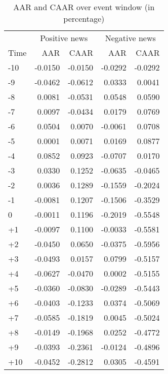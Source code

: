 \begin{table}[ht]
\centering
\begin{tabular}{lrrrr}
  \hline
   & \multicolumn{2}{c}{Positive news} & \multicolumn{2}{c}{Negative news}  \\
  Time & AAR & CAAR & AAR & CAAR \\
 \hline
-10 & -0.0150 & -0.0150 & -0.0292 & -0.0292 \\ 
  -9 & -0.0462 & -0.0612 & 0.0333 & 0.0041 \\ 
  -8 & 0.0081 & -0.0531 & 0.0548 & 0.0590 \\ 
  -7 & 0.0097 & -0.0434 & 0.0179 & 0.0769 \\ 
  -6 & 0.0504 & 0.0070 & -0.0061 & 0.0708 \\ 
  -5 & 0.0001 & 0.0071 & 0.0169 & 0.0877 \\ 
  -4 & 0.0852 & 0.0923 & -0.0707 & 0.0170 \\ 
  -3 & 0.0330 & 0.1252 & -0.0635 & -0.0465 \\ 
  -2 & 0.0036 & 0.1289 & -0.1559 & -0.2024 \\ 
  -1 & -0.0081 & 0.1207 & -0.1506 & -0.3529 \\ 
  0 & -0.0011 & 0.1196 & -0.2019 & -0.5548 \\ 
  +1 & -0.0097 & 0.1100 & -0.0033 & -0.5581 \\ 
  +2 & -0.0450 & 0.0650 & -0.0375 & -0.5956 \\ 
  +3 & -0.0493 & 0.0157 & 0.0799 & -0.5157 \\ 
  +4 & -0.0627 & -0.0470 & 0.0002 & -0.5155 \\ 
  +5 & -0.0360 & -0.0830 & -0.0289 & -0.5443 \\ 
  +6 & -0.0403 & -0.1233 & 0.0374 & -0.5069 \\ 
  +7 & -0.0585 & -0.1819 & 0.0045 & -0.5024 \\ 
  +8 & -0.0149 & -0.1968 & 0.0252 & -0.4772 \\ 
  +9 & -0.0393 & -0.2361 & -0.0124 & -0.4896 \\ 
  +10 & -0.0452 & -0.2812 & 0.0305 & -0.4591 \\ 
   \hline
\end{tabular}
\caption{AAR and CAAR over event window (in percentage)} 
\end{table}

